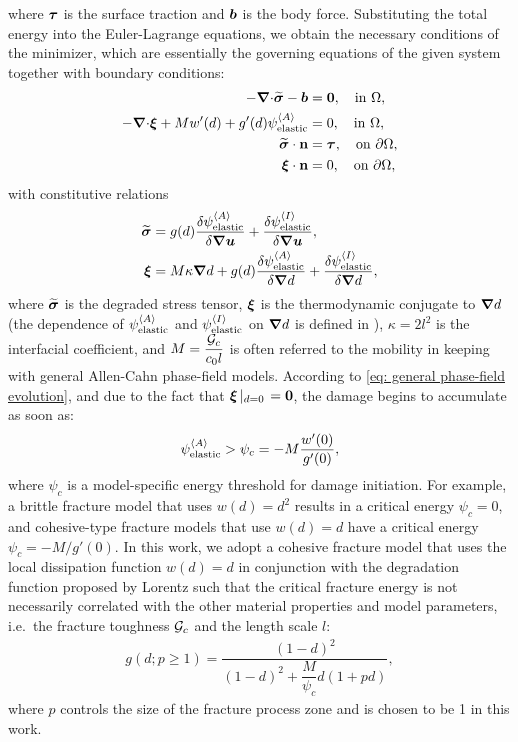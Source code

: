 where $\boldsymbol{\tau}$ is the surface traction and $\boldsymbol{b}$ is the body force. Substituting the total energy into the Euler-Lagrange equations, we obtain the necessary conditions of the minimizer, which are essentially the governing equations of the given system together with boundary conditions:
\begin{align}
  - {\boldsymbol{\nabla} \cdot} \widetilde{\boldsymbol{\sigma}} - \boldsymbol{b}                                      & = \boldsymbol{0} , \quad \text{in }\Omega,             \\
  - {\boldsymbol{\nabla} \cdot} \boldsymbol{\xi} +  M w'(d) + g'(d)\psi_{\text{elastic}}^{\left< A \right>} & = 0, \quad \text{in } \Omega ,                 \\
  \widetilde{\boldsymbol{\sigma}} \cdot \textbf{n}                                               & = \boldsymbol{\tau}, \quad \text{on } {\partial \Omega} , \\
  \boldsymbol{\xi} \cdot \textbf{n}                                               & = 0, \quad \text{on } {\partial \Omega},
\end{align}
with constitutive relations
\begin{align}
  \widetilde{\boldsymbol{\sigma}} & = g(d)\dfrac{\delta \psi_{\text{elastic}}^{\left< A \right>}}{\delta \boldsymbol{\nabla}\boldsymbol{u}} + \dfrac{\delta \psi_{\text{elastic}}^{\left< I \right>}}{\delta \boldsymbol{\nabla}\boldsymbol{u}},              \\
  \boldsymbol{\xi} & = M \kappa \boldsymbol{\nabla} d + g(d) \dfrac{\delta \psi_{\text{elastic}}^{\left< A \right>} }{\delta \boldsymbol{\nabla} d} + \dfrac{\delta \psi_{\text{elastic}}^{\left< I \right>}}{\delta \boldsymbol{\nabla} d},
\end{align}
where $\widetilde{\boldsymbol{\sigma}}$ is the degraded stress tensor, $\boldsymbol{\xi}$ is the thermodynamic conjugate to $\boldsymbol{\nabla} d$ (the dependence of $\psi_{\text{elastic}}^{\left< A \right>}$ and $\psi_{\text{elastic}}^{\left< I \right>}$ on $\boldsymbol{\nabla} d$ is defined in  ), $\kappa = 2l^2$ is the interfacial coefficient, and $M = \dfrac{{\mathcal{G}_c}}{c_0l}$ is often referred to the mobility in keeping with general Allen-Cahn phase-field models. According to \eqref{eq: general phase-field evolution}, and due to the fact that $\boldsymbol{\xi}\left\vert_{d=0}\right. = \boldsymbol{0}$, the damage begins to accumulate as soon as:
\begin{align}
  \psi_{\text{elastic}}^{\left< A \right>} > \psi_c = -M\dfrac{w'(0)}{g'(0)} ,
\end{align}
where $\psi_c$ is a model-specific energy threshold for damage initiation. For example, a brittle fracture model that uses $w(d) = d^2$ results in a critical energy $\psi_c = 0$, and cohesive-type fracture models that use $w(d) = d$ have a critical energy $\psi_c = -M/g'(0)$.  In this work, we adopt a cohesive fracture model that uses the local dissipation function $w(d) = d$ in conjunction with the degradation function proposed by Lorentz \cite{lorentz2011convergence, lorentz2017nonlocal} such that the critical fracture energy is not necessarily correlated with the other material properties and model parameters, i.e.\ the fracture toughness ${\mathcal{G}_c}$ and the length scale $l$:
\begin{align}
  g(d; p \geqslant 1) = \dfrac{(1-d)^2}{(1-d)^2+\dfrac{M}{\psi_c}d(1+pd)} ,
\end{align}
where $p$ controls the size of the fracture process zone and is chosen to be 1 in this work.

